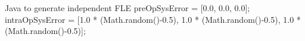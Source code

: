 \begin{javalisting}{Java to generate independent FLE}
	preOpSysError = [0.0, 0.0, 0.0];
        intraOpSysError = [1.0 * (Math.random()-0.5), 
		1.0 * (Math.random()-0.5), 
		1.0 * (Math.random()-0.5)];
\end{javalisting}

